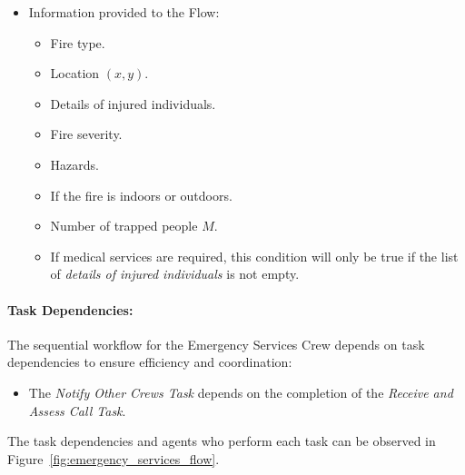 \begin{enumerate}
    \begin{itemize}
        \item Information provided to the Flow:
        \begin{itemize}
            \item Fire type.
            \item Location \((x, y)\).
            \item Details of injured individuals.
            \item Fire severity.
            \item Hazards.
            \item If the fire is indoors or outdoors.
            \item Number of trapped people $M$.
            \item If medical services are required, this condition will only be true if the list of \textit{details of injured individuals}
            is not empty.
        \end{itemize}
    \end{itemize}


\end{enumerate}

\paragraph{Task Dependencies:}

The sequential workflow for the Emergency Services Crew depends on task dependencies to ensure efficiency and coordination:
\begin{itemize}
    \item The \textit{Notify Other Crews Task} depends on the completion of the \textit{Receive and Assess Call Task}.
\end{itemize}

The task dependencies and agents who perform each task can be observed in Figure~\ref{fig:emergency_services_flow}.

